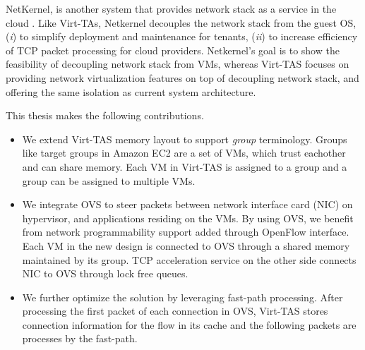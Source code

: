 NetKernel, is another system that provides network stack as a service in the cloud
\cite{niu2021netkernel, niu2017network}.
Like Virt-TAs, Netkernel decouples the network stack from the guest OS, 
(\emph{i}) to simplify deployment and maintenance for tenants, (\emph{ii}) to increase  
efficiency of TCP packet processing for cloud providers. Netkernel's 
goal is to show the feasibility of decoupling network stack from VMs, whereas Virt-TAS
focuses on providing network virtualization features on top of decoupling network stack, and 
offering the same isolation as current system architecture.

This thesis makes the following contributions.
\begin{itemize}
    \item We extend Virt-TAS memory layout to support \emph{group} terminology. Groups 
    like target groups in Amazon EC2 \cite{ec2target} are a set of VMs, which trust 
    eachother and can share memory. 
    Each VM in Virt-TAS is assigned to a group and a group can be assigned to multiple 
    VMs.

    \item We integrate OVS to steer packets between network interface card (NIC) on hypervisor, 
    and applications residing on the VMs. By using OVS, we benefit from network programmability
    support added through OpenFlow interface. Each VM in the new design is connected to OVS 
    through a shared memory maintained by its group. TCP acceleration service on the other 
    side connects NIC to OVS through lock free queues.

    \item We further optimize the solution by leveraging fast-path processing. After processing
    the first packet of each connection in OVS, Virt-TAS stores connection information 
    for the flow in its cache and the following packets are processes by the fast-path.

\end{itemize}





